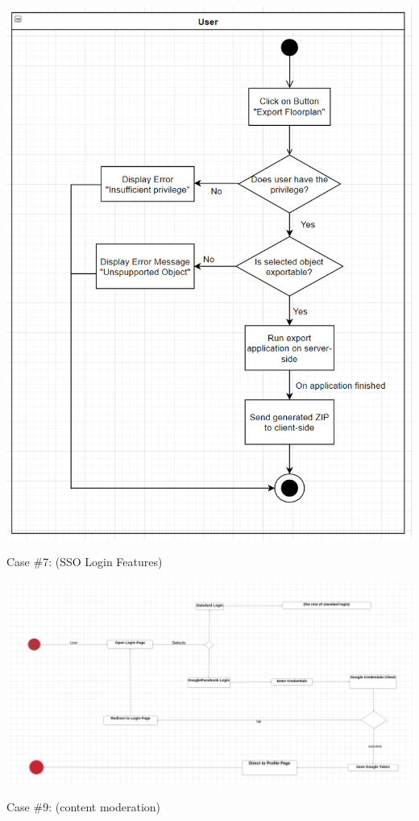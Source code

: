            \includegraphics[width=\textwidth]{images/case2.png}
        
			\noindent Case \#7:
			(SSO Login Features)
			
			\includegraphics[width=\textwidth]{images/sso.png}
			
			\noindent Case \#9:
			(content moderation)
			
